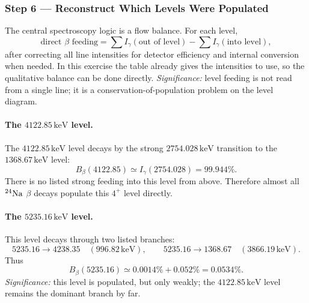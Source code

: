 \subsubsection*{Step 6 --- Reconstruct Which Levels Were Populated}
The central spectroscopy logic is a flow balance. For each level,
\begin{equation}
  \label{eq:lec10:level_balance}
  \boxed{
  \text{direct }\beta\text{ feeding}
  =
  \sum I_\gamma(\text{out of level})
  -
  \sum I_\gamma(\text{into level}),}
\end{equation}
after correcting all line intensities for detector efficiency and internal
conversion when needed. In this exercise the table already gives the intensities
to use, so the qualitative balance can be done directly.
\textit{Significance:} level feeding is not read from a single line; it is a
conservation-of-population problem on the level diagram.

\paragraph{The $4122.85\,\text{keV}$ level.}
The $4122.85\,\text{keV}$ level decays by the strong
$2754.028\,\text{keV}$ transition to the $1368.67\,\text{keV}$ level:
\begin{equation}
  \label{eq:lec10:feed_4122}
  B_\beta(4122.85)\simeq I_\gamma(2754.028)=99.944\%.
\end{equation}
There is no listed strong feeding into this level from above. Therefore almost
all $\nucleus{Na}{24}$ $\beta$ decays populate this $4^+$ level directly.

\paragraph{The $5235.16\,\text{keV}$ level.}
This level decays through two listed branches:
\[
  5235.16\to4238.35 \quad(996.82\,\text{keV}),\qquad
  5235.16\to1368.67 \quad(3866.19\,\text{keV}).
\]
Thus
\begin{equation}
  \label{eq:lec10:feed_5235}
  B_\beta(5235.16)
  \simeq 0.0014\%+0.052\%
  = 0.0534\%.
\end{equation}
\textit{Significance:} this level is populated, but only weakly; the
$4122.85\,\text{keV}$ level remains the dominant branch by far.

